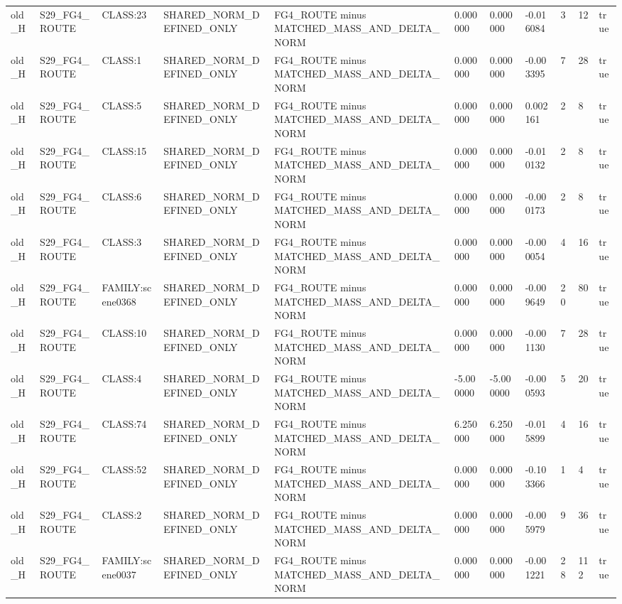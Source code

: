 \begin{tabular}{lllllllllll}
old\_H & S29\_FG4\_ROUTE & CLASS:23 & SHARED\_NORM\_DEFINED\_ONLY & FG4\_ROUTE minus MATCHED\_MASS\_AND\_DELTA\_NORM & 0.000000 & 0.000000 & -0.016084 & 3 & 12 & true \\
old\_H & S29\_FG4\_ROUTE & CLASS:1 & SHARED\_NORM\_DEFINED\_ONLY & FG4\_ROUTE minus MATCHED\_MASS\_AND\_DELTA\_NORM & 0.000000 & 0.000000 & -0.003395 & 7 & 28 & true \\
old\_H & S29\_FG4\_ROUTE & CLASS:5 & SHARED\_NORM\_DEFINED\_ONLY & FG4\_ROUTE minus MATCHED\_MASS\_AND\_DELTA\_NORM & 0.000000 & 0.000000 & 0.002161 & 2 & 8 & true \\
old\_H & S29\_FG4\_ROUTE & CLASS:15 & SHARED\_NORM\_DEFINED\_ONLY & FG4\_ROUTE minus MATCHED\_MASS\_AND\_DELTA\_NORM & 0.000000 & 0.000000 & -0.010132 & 2 & 8 & true \\
old\_H & S29\_FG4\_ROUTE & CLASS:6 & SHARED\_NORM\_DEFINED\_ONLY & FG4\_ROUTE minus MATCHED\_MASS\_AND\_DELTA\_NORM & 0.000000 & 0.000000 & -0.000173 & 2 & 8 & true \\
old\_H & S29\_FG4\_ROUTE & CLASS:3 & SHARED\_NORM\_DEFINED\_ONLY & FG4\_ROUTE minus MATCHED\_MASS\_AND\_DELTA\_NORM & 0.000000 & 0.000000 & -0.000054 & 4 & 16 & true \\
old\_H & S29\_FG4\_ROUTE & FAMILY:scene0368 & SHARED\_NORM\_DEFINED\_ONLY & FG4\_ROUTE minus MATCHED\_MASS\_AND\_DELTA\_NORM & 0.000000 & 0.000000 & -0.009649 & 20 & 80 & true \\
old\_H & S29\_FG4\_ROUTE & CLASS:10 & SHARED\_NORM\_DEFINED\_ONLY & FG4\_ROUTE minus MATCHED\_MASS\_AND\_DELTA\_NORM & 0.000000 & 0.000000 & -0.001130 & 7 & 28 & true \\
old\_H & S29\_FG4\_ROUTE & CLASS:4 & SHARED\_NORM\_DEFINED\_ONLY & FG4\_ROUTE minus MATCHED\_MASS\_AND\_DELTA\_NORM & -5.000000 & -5.000000 & -0.000593 & 5 & 20 & true \\
old\_H & S29\_FG4\_ROUTE & CLASS:74 & SHARED\_NORM\_DEFINED\_ONLY & FG4\_ROUTE minus MATCHED\_MASS\_AND\_DELTA\_NORM & 6.250000 & 6.250000 & -0.015899 & 4 & 16 & true \\
old\_H & S29\_FG4\_ROUTE & CLASS:52 & SHARED\_NORM\_DEFINED\_ONLY & FG4\_ROUTE minus MATCHED\_MASS\_AND\_DELTA\_NORM & 0.000000 & 0.000000 & -0.103366 & 1 & 4 & true \\
old\_H & S29\_FG4\_ROUTE & CLASS:2 & SHARED\_NORM\_DEFINED\_ONLY & FG4\_ROUTE minus MATCHED\_MASS\_AND\_DELTA\_NORM & 0.000000 & 0.000000 & -0.005979 & 9 & 36 & true \\
old\_H & S29\_FG4\_ROUTE & FAMILY:scene0037 & SHARED\_NORM\_DEFINED\_ONLY & FG4\_ROUTE minus MATCHED\_MASS\_AND\_DELTA\_NORM & 0.000000 & 0.000000 & -0.001221 & 28 & 112 & true \\

\end{tabular}
